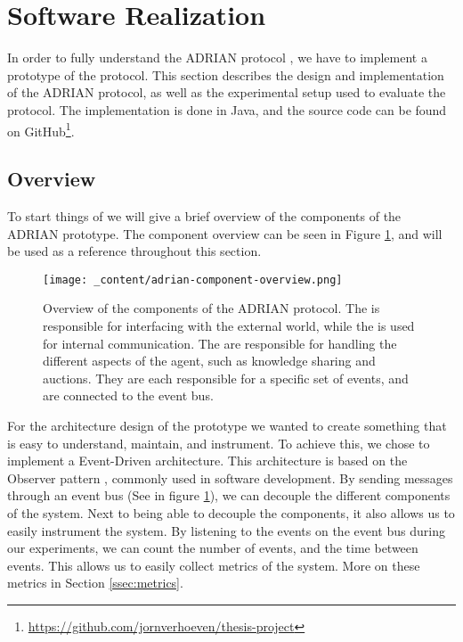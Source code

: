 \section{Software Realization}
\label{sec:software-realization}
In order to fully understand the ADRIAN protocol \cite{mann2023ADRIAN}, we have to implement a prototype of the protocol. This section describes the design and implementation of the ADRIAN protocol, as well as the experimental setup used to evaluate the protocol. The implementation is done in Java, and the source code can be found on GitHub\footnote{\url{https://github.com/jornverhoeven/thesis-project}}. 


\subsection{Overview}
\label{ssec:overview}
To start things of we will give a brief overview of the components of the ADRIAN prototype. The component overview can be seen in Figure \ref{fig:adrian-component-overview}, and will be used as a reference throughout this section.

\begin{figure}[H]
    \centering
    \texttt{[image: \_content/adrian-component-overview.png]}
    \caption{Overview of the components of the ADRIAN protocol. The  is responsible for interfacing with the external world, while the  is used for internal communication. The  are responsible for handling the different aspects of the agent, such as knowledge sharing and auctions. They are each responsible for a specific set of events, and are connected to the event bus.}
    \label{fig:adrian-component-overview}
\end{figure}

For the architecture design of the prototype we wanted to create something that is easy to understand, maintain, and instrument. To achieve this, we chose to implement a Event-Driven architecture. This architecture is based on the Observer pattern \cite{gamma1995design}, commonly used in software development. By sending messages through an event bus (See  in figure \ref{fig:adrian-component-overview}), we can decouple the different components of the system. Next to being able to decouple the components, it also allows us to easily instrument the system. By listening to the events on the event bus during our experiments, we can count the number of events, and the time between events. This allows us to easily collect metrics of the system. More on these metrics in Section \ref{ssec:metrics}.


